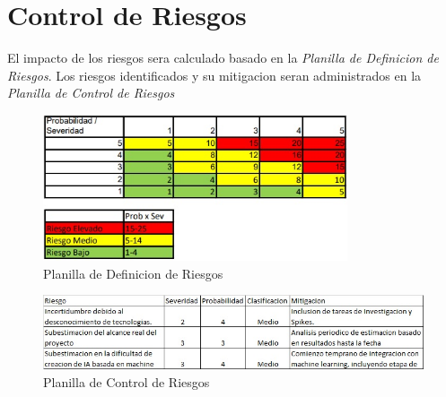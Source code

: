 \documentclass[a4paper]{article}
\begin{document}



\appendix
\section{Control de Riesgos}
\label{anexo:control-de-riesgos}

El impacto de los riesgos sera calculado basado en la \textit{Planilla de Definicion de Riesgos}. Los riesgos identificados y su mitigacion seran administrados en la \textit{Planilla de Control de Riesgos}

\begin{figure}[ht]
    \centering
    \includegraphics[width=0.8\textwidth]{./images/risk-definition.jpg}
    \caption{Planilla de Definicion de Riesgos}
    \label{fig:rd}
\end{figure}

\begin{figure}[ht]
    \centering
    \includegraphics[width=1\textwidth]{./images/risk-management.jpg}
    \caption{Planilla de Control de Riesgos}
    \label{fig:rc}
\end{figure}
\end{document}
